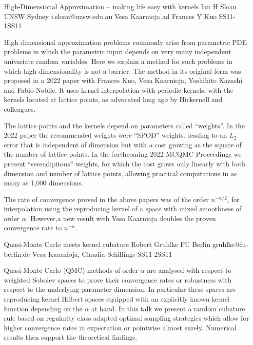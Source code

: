 \begin{talk}
  {High-Dimensional Approximation -- making life easy with kernels}%
  {Ian H Sloan}%
  {UNSW Sydney}%
  {i.sloan@unsw.edu.au}%
  {Vesa Kaarnioja ad Frances Y Kuo}%
{}{}{SS11-1}{SS11}

			
High dimensional approximation problems commonly arise from parametric PDE problems in which the parametric input depends on very many independent univariate random variables.  Here we explain a method for such problems in which high dimensionality is not a barrier.
 The method in its original form was proposed in a 2022 paper with Frances Kuo, Vesa Kaarnioja, Yoshihito Kazashi and Fabio Nobile.  It uses kernel interpolation with periodic kernels, with the kernels located at lattice points, as advocated long ago by Hickernell and colleagues.

The lattice points and the kernels depend on parameters called “weights”.  In the 2022 paper the recommended weights were “SPOD” weights, leading to an $L_2$ error that is independent of dimension but with a cost growing as the square of the number of lattice points.   In the forthcoming 2022 MCQMC Proceedings we present “serendipitous” weights, for which the cost grows only linearly with both dimension and number of lattice points, allowing practical computations in as many as 1,000 dimensions.

The rate of convergence proved in the above papers was of the order $n^{-\alpha/2}$, for interpolation using the  reproducing kernel of a space with mixed smoothness of order $\alpha$.  However,a new result with Vesa Kaarnioja doubles the proven convergence rate to $n^{-\alpha}$.

\end{talk}

\begin{talk}
  {Quasi-Monte Carlo meets kernel cubature}%
  {Robert Gruhlke}%
  {FU Berlin}%
  {gruhlke@fu-berlin.de}%
  {Vesa Kaarnioja, Claudia Schillings}%
{}{}{SS11-2}{SS11}


Quasi-Monte Carlo (QMC) methods of order $\alpha$ are analysed with respect to weighted Sobolev spaces to prove their convergence rates or robustness with respect to the underlying parameter dimension. In particular these spaces are reproducing kernel Hilbert spaces equipped with an explicitly known kernel function depending on the $\alpha$ at hand. In this talk we present a random cubature rule based on regularity class adapted optimal sampling strategies which allow for higher convergence rates in expectation or pointwise almost surely. Numerical results then support the theoretical findings.
\end{talk}

